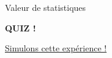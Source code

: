 \documentclass{BeamerTemplate}
\begin{document}
\begin{frame}[t]{Valeur de statistiques}
    
\centerline{\LARGE\bf\alert{QUIZ !}}

  \vspace{2mm}
 
\vfill
    \href{https://019fb411-aa6f-c838-1732-d3f86e705246.share.connect.posit.cloud/}{Simulons cette expérience !}
    
\end{frame}











\end{document}
